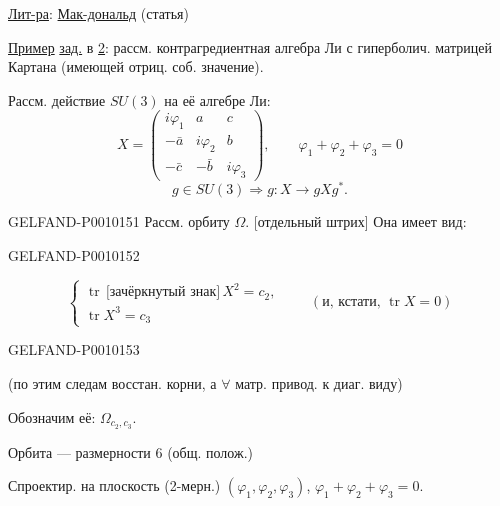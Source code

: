 \underline{Лит-ра}: \underline{Мак-дональд} (статья)

\underline{Пример} \underline{зад.} в \underline{2}: рассм. контрагредиентная алгебра Ли с гиперболич. матрицей Картана (имеющей отриц. соб. значение).

Рассм. действие $SU(3)$ на её алгебре Ли:
\[
X=\begin{pmatrix}
i\varphi_1&a&c\\
-\bar a&i\varphi_2&b\\
-\bar c&-\bar b&i\varphi_3
\end{pmatrix},\qquad
\varphi_1+\varphi_2+\varphi_3=0
\]
\[
g\in SU(3)\Rightarrow g:X\to gXg^*.
\]


\begin{GelfandAdjacentEvidence}{GELFAND-P001015}{1}
Рассм. орбиту $\Omega$. [отдельный штрих] Она имеет вид:
\end{GelfandAdjacentEvidence}
\begin{GelfandAdjacentEvidence}{GELFAND-P001015}{2}

\[
\begin{cases}
\operatorname{tr}\,\text{[зачёркнутый знак]}\,X^2=c_2,\\
\operatorname{tr}X^3=c_3
\end{cases}
\qquad (\text{и, кстати, }\operatorname{tr}X=0)
\]
\end{GelfandAdjacentEvidence}
\begin{GelfandAdjacentEvidence}{GELFAND-P001015}{3}

(по этим следам восстан. корни, а $\forall$ матр. привод. к диаг. виду)

Обозначим её: $\Omega_{c_2,c_3}$.

Орбита --- размерности 6 (общ. полож.)

Спроектир. на плоскость (2-мерн.) $(\varphi_1,\varphi_2,\varphi_3)$,
$\varphi_1+\varphi_2+\varphi_3=0$.

\end{GelfandAdjacentEvidence}
